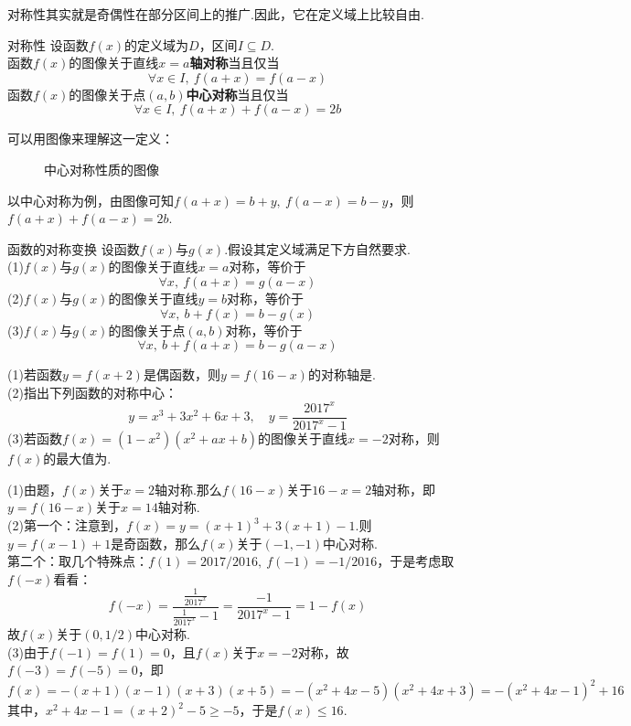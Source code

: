 \documentclass[lang=cn, zihao=5]{elegantbook}
\newcommand{\tk}{\uline{\hspace{4em}}}
\begin{document}
对称性其实就是奇偶性在部分区间上的推广.因此，它在定义域上比较自由.

\begin{definition}{对称性} %
    设函数$f(x)$的定义域为$D$，区间$I \subseteq D$.\\
    函数$f(x)$的图像关于直线$x=a$\textbf{轴对称}当且仅当
    $$ \forall x \in I,~ f(a+x)=f(a-x) $$
    函数$f(x)$的图像关于点$(a,b)$\textbf{中心对称}当且仅当
    $$ \forall x \in I,~ f(a+x)+f(a-x)=2b $$
\end{definition}

可以用图像来理解这一定义：

\begin{figure}[h!]
	\centering
	
	\caption{中心对称性质的图像}
\end{figure}

以中心对称为例，由图像可知$f(a+x)=b+y,~f(a-x)=b-y$，则$f(a+x)+f(a-x)=2b$.

\begin{proposition}{函数的对称变换}
    设函数$f(x)$与$g(x)$.假设其定义域满足下方自然要求.\\
    (1)$f(x)$与$g(x)$的图像关于直线$x=a$对称，等价于$$\forall x,~f(a+x)=g(a-x)$$
    (2)$f(x)$与$g(x)$的图像关于直线$y=b$对称，等价于$$\forall x,~b+f(x)=b-g(x)$$
    (3)$f(x)$与$g(x)$的图像关于点$(a,b)$对称，等价于$$\forall x,~b+f(a+x)=b-g(a-x)$$
\end{proposition}

\begin{example}
	(1)若函数$y=f(x+2)$是偶函数，则$y=f(16-x)$的对称轴是\tk . \\
	(2)指出下列函数的对称中心：$$y=x^3+3x^2+6x+3,\quad y=\frac{2017^x}{2017^x-1}$$
	(3)若函数$f(x)=(1-x^2)(x^2+ax+b)$的图像关于直线$x=-2$对称，则$f(x)$的最大值为\tk .
\end{example}
\begin{solution}
	(1)由题，$f(x)$关于$x=2$轴对称.那么$f(16-x)$关于$16-x=2$轴对称，即$y=f(16-x)$关于$x=14$轴对称. \\
	(2)第一个：注意到，$f(x)=y=(x+1)^3+3(x+1)-1$.则$y=f(x-1)+1$是奇函数，那么$f(x)$关于$(-1,-1)$中心对称. \\
	第二个：取几个特殊点：$f(1)=2017/2016,~f(-1)=-1/2016$，于是考虑取$f(-x)$看看：$$f(-x)=\frac{\frac{1}{2017^x}}{\frac{1}{2017^x}-1} = \frac{-1}{2017^x-1} = 1-f(x)$$
	故$f(x)$关于$(0,1/2)$中心对称. \\
	(3)由于$f(-1)=f(1)=0$，且$f(x)$关于$x=-2$对称，故$f(-3)=f(-5)=0$，即$$f(x)=-(x+1)(x-1)(x+3)(x+5) = -(x^2+4x-5)(x^2+4x+3) = -(x^2+4x-1)^2+16$$
	其中，$x^2+4x-1 = (x+2)^2-5 \geq -5$，于是$f(x) \leq 16$.
\end{solution}
\end{document}
